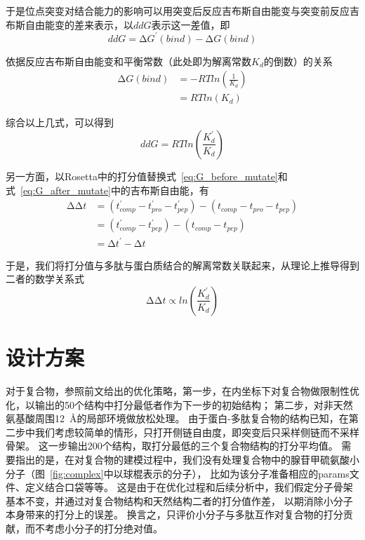 于是位点突变对结合能力的影响可以用突变后反应吉布斯自由能变与突变前反应吉布斯自由能变的差来表示，以$ddG$表示这一差值，即
\begin{equation}
  ddG=\increment G^{'}(bind)-\increment G(bind)
\end{equation}

依据反应吉布斯自由能变和平衡常数（此处即为解离常数$K_d$的倒数）的关系
\begin{align}
  \increment G(bind) &= -RTln(\frac{1}{K_d}) \\
                     &= RTln(K_d)
\end{align}

综合以上几式，可以得到
\begin{equation}
  ddG=RTln(\frac{K_{d}^{'}}{K_d})
\end{equation}

另一方面，以Rosetta中的打分值替换式~\eqref{eq:G_before_mutate}和式~\eqref{eq:G_after_mutate}中的吉布斯自由能，有
\begin{align}
  \increment\increment t &= (t_{comp}^{'}-t_{pro}^{'}-t_{pep}^{'})-(t_{comp}-t_{pro}-t_{pep}) \\
                         &= (t_{comp}^{'}-t_{pep}^{'})-(t_{comp}-t_{pep}) \\
                         &= \increment t^{'}-\increment t
\end{align}

于是，我们将打分值与多肽与蛋白质结合的解离常数关联起来，从理论上推导得到二者的数学关系式
\begin{equation}
  \increment\increment t\propto ln(\frac{K_{d}^{'}}{K_d})
  \label{eq:relationship}
\end{equation}


\section{设计方案}
对于复合物，参照前文给出的优化策略，第一步，在内坐标下对复合物做限制性优化，以输出的50个结构中打分最低者作为下一步的初始结构；
第二步，对非天然氨基酸周围\SI{12}{Å}的局部环境做放松处理。
由于蛋白-多肽复合物的结构已知，在第二步中我们考虑较简单的情形，只打开侧链自由度，即突变后只采样侧链而不采样骨架。
这一步输出200个结构，取打分最低的三个复合物结构的打分平均值。
需要指出的是，在对复合物的建模过程中，我们没有处理复合物中的腺苷甲硫氨酸小分子（图~\ref{fig:complex}中以球棍表示的分子），
比如为该分子准备相应的params文件、定义结合口袋等等。
这是由于在优化过程和后续分析中，我们假定分子骨架基本不变，并通过对复合物结构和天然结构二者的打分值作差，
以期消除小分子本身带来的打分上的误差。
换言之，只评价小分子与多肽互作对复合物的打分贡献，而不考虑小分子的打分绝对值。

